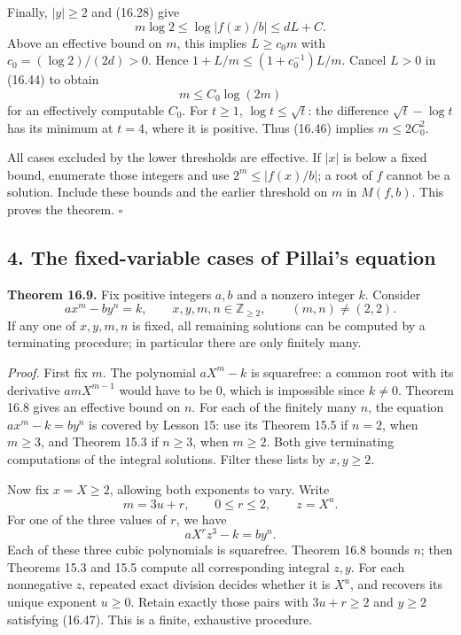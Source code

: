 \documentclass[
  11pt,
  a4paper,
]{article}
\begin{document}
Finally, \(|y|\geq2\) and (16.28) give \[
 m\log2\leq\log|f(x)/b|\leq dL+C.
 \tag{16.45}
\] Above an effective bound on \(m\), this implies \(L\geq c_0m\) with
\(c_0=(\log2)/(2d)>0\). Hence \(1+L/m\leq(1+c_0^{-1})L/m\). Cancel
\(L>0\) in (16.44) to obtain \[
 m\leq C_0\log(2m)
 \tag{16.46}
\] for an effectively computable \(C_0\). For \(t\geq1\),
\(\log t\leq\sqrt t\): the difference \(\sqrt t-\log t\) has its minimum
at \(t=4\), where it is positive. Thus (16.46) implies \(m\leq2C_0^2\).

All cases excluded by the lower thresholds are effective. If \(|x|\) is
below a fixed bound, enumerate those integers and use
\(2^m\leq|f(x)/b|\); a root of \(f\) cannot be a solution. Include these
bounds and the earlier threshold on \(m\) in \(M(f,b)\). This proves the
theorem. \(\square\)

\subsection{4. The fixed-variable cases of Pillai's
equation}\label{the-fixed-variable-cases-of-pillais-equation}

\textbf{Theorem 16.9.} Fix positive integers \(a,b\) and a nonzero
integer \(k\). Consider \[
 ax^m-by^n=k,\qquad x,y,m,n\in\mathbb Z_{\geq2},
 \qquad (m,n)\ne(2,2).
 \tag{16.47}
\] If any one of \(x,y,m,n\) is fixed, all remaining solutions can be
computed by a terminating procedure; in particular there are only
finitely many.

\emph{Proof.} First fix \(m\). The polynomial \(aX^m-k\) is squarefree:
a common root with its derivative \(amX^{m-1}\) would have to be \(0\),
which is impossible since \(k\ne0\). Theorem 16.8 gives an effective
bound on \(n\). For each of the finitely many \(n\), the equation
\(a x^m-k=b y^n\) is covered by Lesson 15: use its Theorem 15.5 if
\(n=2\), when \(m\geq3\), and Theorem 15.3 if \(n\geq3\), when
\(m\geq2\). Both give terminating computations of the integral
solutions. Filter these lists by \(x,y\geq2\).

Now fix \(x=X\geq2\), allowing both exponents to vary. Write \[
 m=3u+r,\qquad 0\leq r\leq2,\qquad z=X^u.
 \tag{16.48}
\] For one of the three values of \(r\), we have \[
 aX^r z^3-k=b y^n.
 \tag{16.49}
\] Each of these three cubic polynomials is squarefree. Theorem 16.8
bounds \(n\); then Theorems 15.3 and 15.5 compute all corresponding
integral \(z,y\). For each nonnegative \(z\), repeated exact division
decides whether it is \(X^u\), and recovers its unique exponent
\(u\geq0\). Retain exactly those pairs with \(3u+r\geq2\) and \(y\geq2\)
satisfying (16.47). This is a finite, exhaustive procedure.
\end{document}

